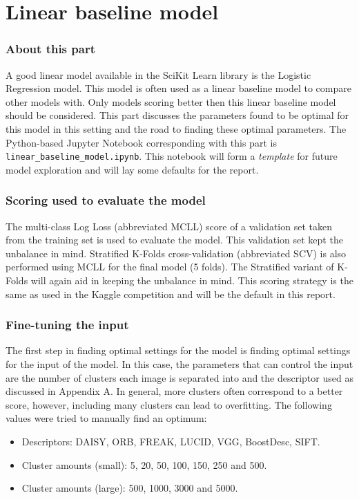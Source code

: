 \part{Linear baseline model}
\label{part:linear_baseline}


\section{About this part}
\label{section:LBM_about_part}
A good linear model available in the SciKit Learn library is the Logistic Regression model.
This model is often used as a linear baseline model to compare other models with.
Only models scoring better then this linear baseline model should be considered.
This part discusses the parameters found to be optimal for this model in this setting and the road to finding these optimal parameters.
The Python-based Jupyter Notebook corresponding with this part is \texttt{linear\_baseline\_model.ipynb}.
This notebook will form a \emph{template} for future model exploration and will lay some defaults for the report.


\section{Scoring used to evaluate the model}
\label{section:LBM_scoring_used}

The multi-class Log Loss (abbreviated MCLL) score of a validation set taken from the training set is used to evaluate the model.
This validation set kept the unbalance in mind.
Stratified K-Folds cross-validation (abbreviated SCV) is also performed using MCLL for the final model (5 folds).
The Stratified variant of K-Folds will again aid in keeping the unbalance in mind.
This scoring strategy is the same as used in the Kaggle competition and will be the default in this report.


\section{Fine-tuning the input}
\label{section:LBM_finetuning_clusters}
The first step in finding optimal settings for the model is finding optimal settings for the input of the model.
In this case, the parameters that can control the input are the number of clusters each image is separated into and the descriptor used as discussed in Appendix A.
In general, more clusters often correspond to a better score, however, including many clusters can lead to overfitting.
The following values were tried to manually find an optimum:
\begin{itemize}
    \item Descriptors: DAISY, ORB, FREAK, LUCID, VGG, BoostDesc, SIFT.
    \item Cluster amounts (small): 5, 20, 50, 100, 150, 250 and 500.
    \item Cluster amounts (large): 500, 1000, 3000 and 5000.
\end{itemize}

